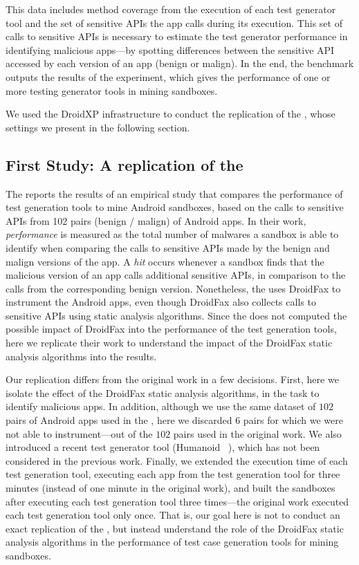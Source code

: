 This data includes method coverage from the execution of each test generator tool and the
set of sensitive APIs the app calls during its execution. This set of calls to
sensitive APIs is necessary to estimate the test generator performance in identifying malicious apps---by spotting
differences between the sensitive API accessed by each version of an app (benign or malign).
In the end, the benchmark outputs the results of the experiment, which gives the
performance of one or more testing generator tools in mining sandboxes.

We used the DroidXP infrastructure to conduct the replication of
the \blls, whose settings we present in the following section. 

\subsection{First Study: A replication of the \blls}\label{sec:set1}

The \blls reports the results of an empirical study that compares the performance of test generation tools to mine Android
sandboxes, based on the calls to sensitive APIs from 102 pairs (benign / malign) of Android apps. In their work, \emph{performance} is
measured as the total number of malwares a sandbox is able to identify when comparing the calls to sensitive APIs made by
the benign and malign versions of the app. A \emph{hit} occurs whenever a sandbox finds that the malicious version of an app calls
additional sensitive APIs, in comparison to the calls from the corresponding benign version.
Nonetheless, the \blls uses DroidFax to instrument the Android apps, even though DroidFax also
collects calls to sensitive APIs using static analysis algorithms. Since the \blls does not
computed the possible impact of DroidFax into the performance of the test generation tools,
here we replicate their work to understand the impact of the DroidFax static analysis algorithms into the \blls results.

Our replication differs from the original work in a few decisions. First, here we isolate
the effect of the DroidFax static analysis algorithms, in the task to identify malicious apps. In addition, although we use the same dataset of
$102$ pairs of Android apps used in the \blls, here we discarded $6$ pairs for which
we were not able to instrument---out of the $102$ pairs used in the original work. We also introduced a recent test generator tool (Humanoid ~\cite{DBLP:conf/kbse/LiY0C19}), which
has not been considered in the previous work. Finally, we extended the execution time of each test generation tool,
executing each app from the test generation tool for three minutes (instead of one minute in the
original work),
and built the sandboxes after executing each test generation tool
three times---the original work executed each test generation tool
only once. That is, our goal here is not to conduct an
exact replication of the \blls, but instead understand
the role of the DroidFax static analysis algorithms in the
performance of test case generation tools for mining sandboxes.

